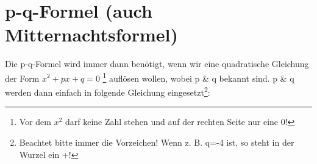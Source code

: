 \section{p-q-Formel (auch Mitternachtsformel)}
	Die p-q-Formel wird immer dann benötigt, wenn wir eine quadratische Gleichung
	der Form \(x^2 + p x + q = 0\) \footnote{Vor dem \(x^2\) darf keine Zahl stehen
	und auf der rechten Seite nur eine 0!} auflösen wollen, wobei p \& q bekannt
	sind. p \& q werden dann einfach in folgende Gleichung
	eingesetzt\footnote{Beachtet bitte immer die Vorzeichen! Wenn z. B. q=-4 ist,
	so steht in der Wurzel ein +!}:
	\formel{
		\[x_{1,2}=-\frac{p}{2}\pm \sqrt{\left ( \frac{p}{2} \right)^2-q}\]
	}
	